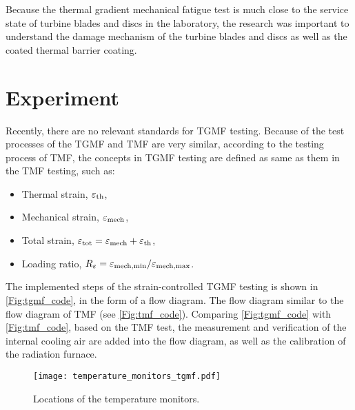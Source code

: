 \documentclass[preprint,5p,twocolumn,11pt,sort&compress]{elsarticle}
\begin{document}
Because the thermal gradient mechanical fatigue test is much close to the service state of turbine blades and discs in the laboratory, the research was important to understand the damage mechanism of the turbine blades and discs as well as the coated thermal barrier coating.


\section{Experiment}

Recently, there are no relevant standards for TGMF testing. Because of the test processes of the TGMF and TMF are very similar, according to the testing process of TMF, the concepts in TGMF testing are defined as same as them in the TMF testing, such as:
\begin{itemize}
  \item {Thermal strain}, $\varepsilon_{\rm{th}}$,
  \item {Mechanical strain}, $\varepsilon_{\rm{mech}}$,
  \item {Total strain}, $\varepsilon_{\rm{tot}}=\varepsilon_{\rm{mech}}+\varepsilon_{\rm{th}}$,
  \item {Loading ratio}, $R_{\varepsilon}=\varepsilon_{\rm{mech,min}}/\varepsilon_{\rm{mech,max}}$.
\end{itemize}


The implemented steps of the strain-controlled TGMF testing is shown in \autoref{Fig:tgmf_code}, in the form of a flow diagram. The flow diagram similar to the flow diagram of TMF (see \autoref{Fig:tmf_code}). Comparing \autoref{Fig:tgmf_code} with \autoref{Fig:tmf_code}, based on the TMF test, the measurement and verification of the internal cooling air are added into the flow diagram, as well as the calibration of the radiation furnace.

\begin{figure}[!htp]
	\centering
	\texttt{[image: temperature\_monitors\_tgmf.pdf]}
	\caption{Locations of the temperature monitors.}
	\label{Fig:temperature_monitors_tgmf}
\end{figure}
\end{document}
